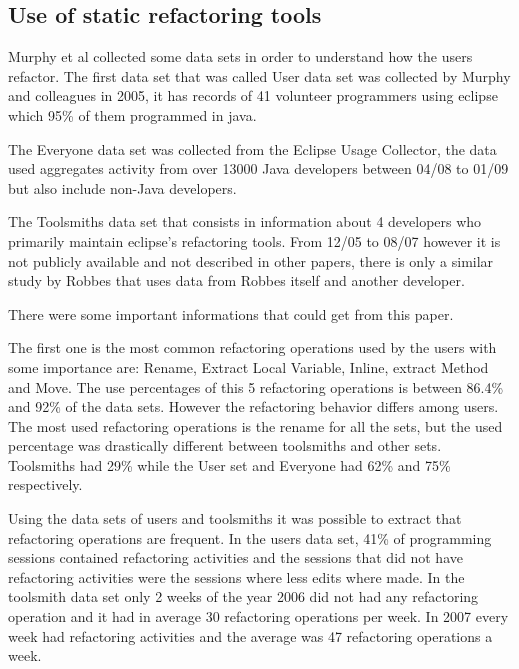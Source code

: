 
\subsection{Use of static refactoring tools}

Murphy et al \cite{murphy2012we} collected some data sets in order to understand how the users refactor.
The first data set that was called User data set was collected by Murphy and colleagues \cite{murphy2006java} in 2005, it has records of 41 volunteer programmers using eclipse which 95\% of them programmed in java. %

The Everyone data set was collected from the Eclipse Usage Collector, the data used aggregates activity from over 13000 Java developers between 04/08 to 01/09 but also include non-Java developers.

The Toolsmiths data set that consists in information about 4 developers who primarily maintain eclipse's refactoring tools. From 12/05 to 08/07 however it is not publicly available and not described in other papers, there is only a similar study by Robbes \cite{robbes2007mining} that uses data from Robbes itself and another developer. 


There were some important informations that could get from this paper.

The first one is the most common refactoring operations used by the users with some importance are: Rename, Extract Local Variable, Inline, extract Method and Move. The use percentages of this 5 refactoring operations is between 86.4\% and 92\% of the data sets. %
However the refactoring behavior differs among users. The most used refactoring operations is the rename for all the sets, but the used percentage was drastically different between toolsmiths and other sets. Toolsmiths had 29\% while the User set and Everyone had 62\% and 75\% respectively.

Using the data sets of users and toolsmiths it was possible to extract that refactoring operations are frequent. 
In the users data set, 41\% of programming sessions contained refactoring activities and the sessions that did not have refactoring activities were the sessions where less edits where made.
In the toolsmith data set only 2 weeks of the year 2006 did not had any refactoring operation and it had in average 30 refactoring operations per week. 
In 2007 every week had refactoring activities and the average was 47 refactoring operations a week.

